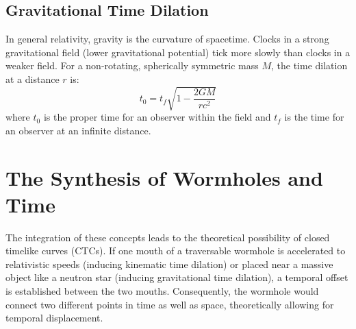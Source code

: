 \documentclass[12pt, a4paper]{article}
\begin{document}
\subsection{Gravitational Time Dilation}
In general relativity, gravity is the curvature of spacetime. Clocks in a strong gravitational field (lower gravitational potential) tick more slowly than clocks in a weaker field. For a non-rotating, spherically symmetric mass $M$, the time dilation at a distance $r$ is:
\[ t_0 = t_f \sqrt{1 - \frac{2GM}{rc^2}} \]
where $t_0$ is the proper time for an observer within the field and $t_f$ is the time for an observer at an infinite distance.

\section{The Synthesis of Wormholes and Time}
The integration of these concepts leads to the theoretical possibility of closed timelike curves (CTCs). If one mouth of a traversable wormhole is accelerated to relativistic speeds (inducing kinematic time dilation) or placed near a massive object like a neutron star (inducing gravitational time dilation), a temporal offset is established between the two mouths. Consequently, the wormhole would connect two different points in time as well as space, theoretically allowing for temporal displacement.
\end{document}
